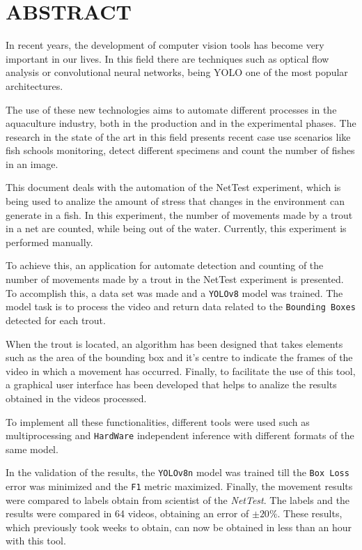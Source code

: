 \section*{ABSTRACT}
\thispagestyle{abstract}
In recent years, the development of computer vision tools has become very important in our lives. In this field there are techniques such as optical flow analysis or 
convolutional neural networks, being YOLO one of the most popular architectures.

The use of these new technologies aims to automate different processes in the aquaculture industry, both in the production and in the experimental phases. The research in the 
state of the art in this field presents recent case use scenarios like fish schools monitoring, detect different specimens and count the number of fishes in an image.

This document deals with the automation of the NetTest experiment, which is being used to analize the amount of stress that changes in the environment can generate in a fish. 
In this experiment, the number of movements made by a trout in a net are counted, while being out of the water. Currently, this experiment is performed manually.

To achieve this, an application for automate detection and counting of the number of movements made by a trout in the NetTest experiment is presented. To accomplish this, 
a data set was made and a \texttt{YOLOv8} model was trained. The model task is to process the video and return data related to the \texttt{Bounding Boxes} detected for each trout.

When the trout is located, an algorithm has been designed that takes elements such as the area of the bounding box and it's centre to indicate the frames of the video in which a 
movement has occurred. Finally, to facilitate the use of this tool, a graphical user interface has been developed that helps to analize the results obtained in the videos processed.

To implement all these functionalities, different tools were used such as multiprocessing and \texttt{HardWare} independent inference with different formats of the same model.

In the validation of the results, the \texttt{YOLOv8n} model was trained till the \texttt{Box Loss} error was minimized and the \texttt{F1} metric maximized. Finally, 
the movement results were compared to labels obtain from scientist of the \textit{NetTest}. The labels and the results were compared in 64 videos, obtaining an error 
of \texttt{$ \pm 20\% $}. These results, which previously took weeks to obtain, can now be obtained in less than an hour with this tool.